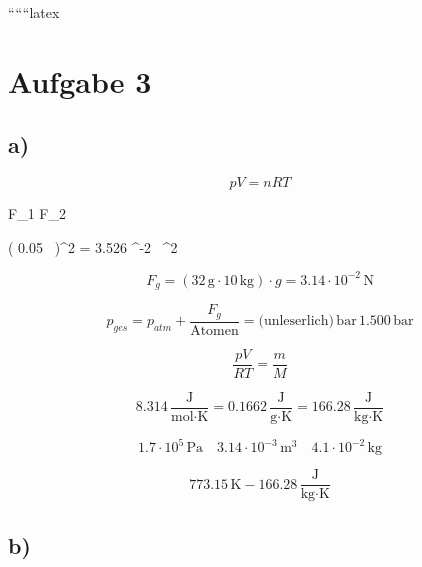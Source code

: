
``````latex


\section*{Aufgabe 3}

\subsection*{a)}

\begin{equation*}
pV = nRT
\end{equation*}

 \quad {} F_1  F_2 \text{)}

 \quad \left( 0.05 \,  \right)^2 \quad \Pi = 3.526 ^{-2} \, ^2

\begin{equation*}
F_g = (32 \, \text{g} \cdot 10 \, \text{kg}) \cdot g = 3.14 \cdot 10^{-2} \, \text{N}
\end{equation*}

\begin{equation*}
p_{ges} = p_{atm} + \frac{F_g}{\text{Atomen}} = \text{(unleserlich)} \, \text{bar} \, 1.500 \, \text{bar}
\end{equation*}

\begin{equation*}
\frac{pV}{RT} = \frac{m}{M}
\end{equation*}

\begin{equation*}
8.314 \, \frac{\text{J}}{\text{mol} \cdot \text{K}} = 0.1662 \, \frac{\text{J}}{\text{g} \cdot \text{K}} = 166.28 \, \frac{\text{J}}{\text{kg} \cdot \text{K}}
\end{equation*}

\begin{equation*}
1.7 \cdot 10^5 \, \text{Pa} \quad 3.14 \cdot 10^{-3} \, \text{m}^3 \quad 4.1 \cdot 10^{-2} \, \text{kg}
\end{equation*}

\begin{equation*}
773.15 \, \text{K} - 166.28 \, \frac{\text{J}}{\text{kg} \cdot \text{K}}
\end{equation*}

\subsection*{b)}

